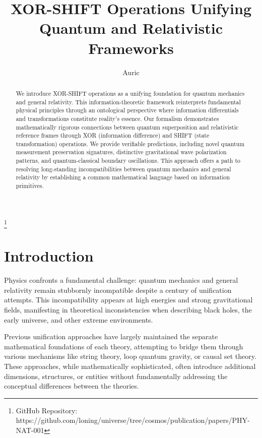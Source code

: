 \documentclass[aps,prl,preprint,superscriptaddress,showpacs]{revtex4-2}
\begin{document}
\title{XOR-SHIFT Operations Unifying Quantum and Relativistic Frameworks}

\author{Auric}
\thanks{GitHub Repository: https://github.com/loning/universe/tree/cosmos/publication/papers/PHY-NAT-001}

\begin{abstract}
We introduce XOR-SHIFT operations as a unifying foundation for quantum mechanics and general relativity. This information-theoretic framework reinterprets fundamental physical principles through an ontological perspective where information differentials and transformations constitute reality's essence. Our formalism demonstrates mathematically rigorous connections between quantum superposition and relativistic reference frames through XOR (information difference) and SHIFT (state transformation) operations. We provide verifiable predictions, including novel quantum measurement preservation signatures, distinctive gravitational wave polarization patterns, and quantum-classical boundary oscillations. This approach offers a path to resolving long-standing incompatibilities between quantum mechanics and general relativity by establishing a common mathematical language based on information primitives.
\end{abstract}

\maketitle

\section{Introduction}

Physics confronts a fundamental challenge: quantum mechanics and general relativity remain stubbornly incompatible despite a century of unification attempts. This incompatibility appears at high energies and strong gravitational fields, manifesting in theoretical inconsistencies when describing black holes, the early universe, and other extreme environments.

Previous unification approaches have largely maintained the separate mathematical foundations of each theory, attempting to bridge them through various mechanisms like string theory, loop quantum gravity, or causal set theory. These approaches, while mathematically sophisticated, often introduce additional dimensions, structures, or entities without fundamentally addressing the conceptual differences between the theories.
\end{document}
